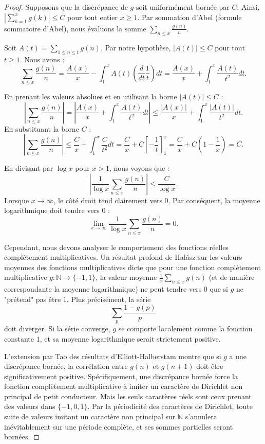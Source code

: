 \documentclass[12pt]{article}
\begin{document}
\begin{proof}
Supposons que la discr\'epance de $g$ soit uniform\'ement born\'ee par $C$. Ainsi, $\left| \sum_{k=1}^x g(k) \right| \leq C$ pour tout entier $x \geq 1$. Par sommation d'Abel (formule sommatoire d'Abel), nous \'evaluons la somme $\sum_{n \leq x} \frac{g(n)}{n}$.

Soit $A(t) = \sum_{1 \leq n \leq t} g(n)$. Par notre hypoth\`ese, $|A(t)| \leq C$ pour tout $t \geq 1$. Nous avons :
\[
\sum_{n \leq x} \frac{g(n)}{n} = \frac{A(x)}{x} - \int_{1}^{x} A(t) \left( \frac{d}{dt} \frac{1}{t} \right) dt = \frac{A(x)}{x} + \int_{1}^{x} \frac{A(t)}{t^2} dt.
\]

En prenant les valeurs absolues et en utilisant la borne $|A(t)| \leq C$ :
\[
\left| \sum_{n \leq x} \frac{g(n)}{n} \right| = \left| \frac{A(x)}{x} + \int_{1}^{x} \frac{A(t)}{t^2} dt \right| \leq \frac{|A(x)|}{x} + \int_{1}^{x} \frac{|A(t)|}{t^2} dt.
\]
En substituant la borne $C$ :
\[
\left| \sum_{n \leq x} \frac{g(n)}{n} \right| \leq \frac{C}{x} + \int_{1}^{x} \frac{C}{t^2} dt = \frac{C}{x} + C\left[ -\frac{1}{t} \right]_{1}^{x} = \frac{C}{x} + C\left( 1 - \frac{1}{x} \right) = C.
\]

En divisant par $\log x$ pour $x > 1$, nous voyons que :
\[
\left| \frac{1}{\log x} \sum_{n \leq x} \frac{g(n)}{n} \right| \leq \frac{C}{\log x}.
\]
Lorsque $x \to \infty$, le c\^ot\'e droit tend clairement vers $0$. Par cons\'equent, la moyenne logarithmique doit tendre vers $0$ :
\[
\lim_{x \to \infty} \frac{1}{\log x} \sum_{n \leq x} \frac{g(n)}{n} = 0.
\]

Cependant, nous devons analyser le comportement des fonctions r\'eelles compl\`etement multiplicatives. Un r\'esultat profond de Hal\'asz sur les valeurs moyennes des fonctions multiplicatives dicte que pour une fonction compl\`etement multiplicative $g: \mathbb{N} \to \{-1, 1\}$, la valeur moyenne $\frac{1}{x} \sum_{n \leq x} g(n)$ (et de mani\`ere correspondante la moyenne logarithmique) ne peut tendre vers $0$ que si $g$ ne "pr\'etend" pas \^etre $1$. Plus pr\'ecis\'ement, la s\'erie
\[
\sum_{p} \frac{1 - g(p)}{p}
\]
doit diverger. Si la s\'erie converge, $g$ se comporte localement comme la fonction constante $1$, et sa moyenne logarithmique serait strictement positive.

L'extension par Tao des r\'esultats d'Elliott-Halberstam montre que si $g$ a une discr\'epance born\'ee, la corr\'elation entre $g(n)$ et $g(n+1)$ doit \^etre significativement positive. Sp\'ecifiquement, une discr\'epance born\'ee force la fonction compl\`etement multiplicative \`a imiter un caract\`ere de Dirichlet non principal de petit conducteur. Mais les seuls caract\`eres r\'eels sont ceux prenant des valeurs dans $\{-1, 0, 1\}$. Par la p\'eriodicit\'e des caract\`eres de Dirichlet, toute suite de valeurs imitant un caract\`ere non principal sur $\mathbb{N}$ s'annulera in\'evitablement sur une p\'eriode compl\`ete, et ses sommes partielles seront born\'ees.


\end{proof}
\end{document}

